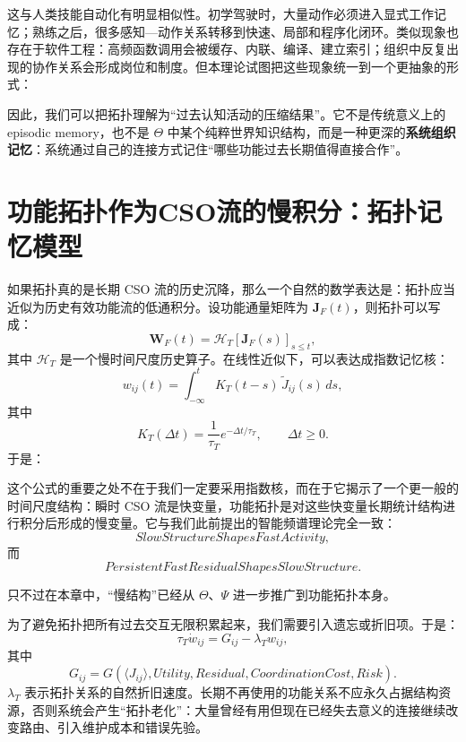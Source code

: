 这与人类技能自动化有明显相似性。初学驾驶时，大量动作必须进入显式工作记忆；熟练之后，很多感知—动作关系转移到快速、局部和程序化闭环。类似现象也存在于软件工程：高频函数调用会被缓存、内联、编译、建立索引；组织中反复出现的协作关系会形成岗位和制度。但本理论试图把这些现象统一到一个更抽象的形式：
\begin{statementbox}
\centering
{}
\end{statementbox}

因此，我们可以把拓扑理解为``过去认知活动的压缩结果''。它不是传统意义上的 episodic memory，也不是 $\Theta$ 中某个纯粹世界知识结构，而是一种更深的\textbf{系统组织记忆}：系统通过自己的连接方式记住``哪些功能过去长期值得直接合作''。


\section{功能拓扑作为CSO流的慢积分：拓扑记忆模型}

如果拓扑真的是长期 CSO 流的历史沉降，那么一个自然的数学表达是：拓扑应当近似为历史有效功能流的低通积分。设功能通量矩阵为 $\mathbf{J}_F(t)$，则拓扑可以写成：
\[
\boxed{
\mathbf{W}_F(t)
=
\mathcal{H}_{T}
\left[
\mathbf{J}_F(s)
\right]_{s\leq t},
}
\]
其中 $\mathcal{H}_{T}$ 是一个慢时间尺度历史算子。在线性近似下，可以表达成指数记忆核：
\[
w_{ij}(t)
=
\int_{-\infty}^{t}
K_T(t-s)
\,
\widetilde{J}_{ij}(s)
\,ds,
\]
其中
\[
K_T(\Delta t)
=
\frac{1}{\tau_T}
e^{-\Delta t/\tau_T},
\qquad
\Delta t\geq0.
\]
于是：
\begin{statementbox}
\centering
{}
\end{statementbox}

这个公式的重要之处不在于我们一定要采用指数核，而在于它揭示了一个更一般的时间尺度结构：瞬时 CSO 流是快变量，功能拓扑是对这些快变量长期统计结构进行积分后形成的慢变量。它与我们此前提出的智能频谱理论完全一致：
\[
SlowStructureShapesFastActivity,
\]
而
\[
PersistentFastResidualShapesSlowStructure.
\]

只不过在本章中，``慢结构''已经从 $\Theta$、$\Psi$ 进一步推广到功能拓扑本身。

为了避免拓扑把所有过去交互无限积累起来，我们需要引入遗忘或折旧项。于是：
\[
\tau_T\dot w_{ij}
=
G_{ij}
-
\lambda_Tw_{ij},
\]
其中
\[
G_{ij}
=
G
\left(
\langle J_{ij}\rangle,
Utility,
Residual,
CoordinationCost,
Risk
\right).
\]
$\lambda_T$ 表示拓扑关系的自然折旧速度。长期不再使用的功能关系不应永久占据结构资源，否则系统会产生``拓扑老化''：大量曾经有用但现在已经失去意义的连接继续改变路由、引入维护成本和错误先验。

